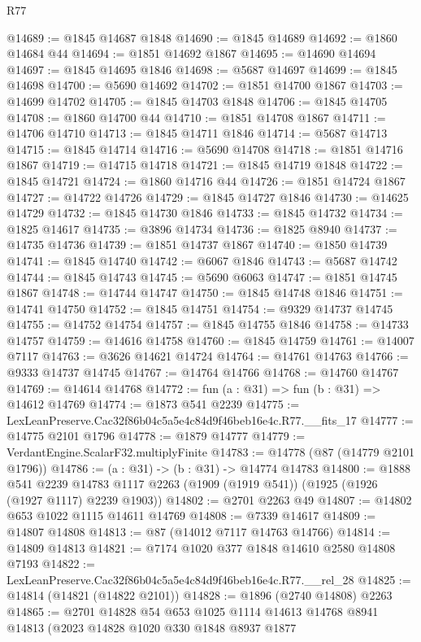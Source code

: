 \begin{lexlean}{R77}
\begin{coremodule}
@14689 := @1845 @14687 @1848
@14690 := @1845 @14689
@14692 := @1860 @14684 @44
@14694 := @1851 @14692 @1867
@14695 := @14690 @14694
@14697 := @1845 @14695 @1846
@14698 := @5687 @14697
@14699 := @1845 @14698
@14700 := @5690 @14692
@14702 := @1851 @14700 @1867
@14703 := @14699 @14702
@14705 := @1845 @14703 @1848
@14706 := @1845 @14705
@14708 := @1860 @14700 @44
@14710 := @1851 @14708 @1867
@14711 := @14706 @14710
@14713 := @1845 @14711 @1846
@14714 := @5687 @14713
@14715 := @1845 @14714
@14716 := @5690 @14708
@14718 := @1851 @14716 @1867
@14719 := @14715 @14718
@14721 := @1845 @14719 @1848
@14722 := @1845 @14721
@14724 := @1860 @14716 @44
@14726 := @1851 @14724 @1867
@14727 := @14722 @14726
@14729 := @1845 @14727 @1846
@14730 := @14625 @14729
@14732 := @1845 @14730 @1846
@14733 := @1845 @14732
@14734 := @1825 @14617
@14735 := @3896 @14734
@14736 := @1825 @8940
@14737 := @14735 @14736
@14739 := @1851 @14737 @1867
@14740 := @1850 @14739
@14741 := @1845 @14740
@14742 := @6067 @1846
@14743 := @5687 @14742
@14744 := @1845 @14743
@14745 := @5690 @6063
@14747 := @1851 @14745 @1867
@14748 := @14744 @14747
@14750 := @1845 @14748 @1846
@14751 := @14741 @14750
@14752 := @1845 @14751
@14754 := @9329 @14737 @14745
@14755 := @14752 @14754
@14757 := @1845 @14755 @1846
@14758 := @14733 @14757
@14759 := @14616 @14758
@14760 := @1845 @14759
@14761 := @14007 @7117
@14763 := @3626 @14621 @14724
@14764 := @14761 @14763
@14766 := @9333 @14737 @14745
@14767 := @14764 @14766
@14768 := @14760 @14767
@14769 := @14614 @14768
@14772 := fun (a : @31) => fun (b : @31) => @14612 @14769
@14774 := @1873 @541 @2239
@14775 := LexLeanPreserve.Cac32f86b04c5a5e4c84d9f46beb16e4c.R77.__fits_17
@14777 := @14775 @2101 @1796
@14778 := @1879 @14777
@14779 := VerdantEngine.ScalarF32.multiplyFinite
@14783 := @14778 (@87 (@14779 @2101 @1796))
@14786 := (a : @31) -> (b : @31) -> @14774 @14783
@14800 := @1888
    @541
    @2239
    @14783
    @1117
    @2263
    (@1909 (@1919 @541))
    (@1925 (@1926 (@1927 @1117) @2239 @1903))
@14802 := @2701 @2263 @49
@14807 := @14802 @653 @1022 @1115 @14611 @14769
@14808 := @7339 @14617
@14809 := @14807 @14808
@14813 := @87 (@14012 @7117 @14763 @14766)
@14814 := @14809 @14813
@14821 := @7174 @1020 @377 @1848 @14610 @2580 @14808 @7193
@14822 := LexLeanPreserve.Cac32f86b04c5a5e4c84d9f46beb16e4c.R77.__rel_28
@14825 := @14814 (@14821 (@14822 @2101))
@14828 := @1896 (@2740 @14808) @2263
@14865 := @2701
    @14828
    @54
    @653
    @1025
    @1114
    @14613
    @14768
    @8941
    @14813
    (@2023
      @14828
      @1020
      @330
      @1848
      @8937
      @1877

\end{coremodule}
\end{lexlean}

